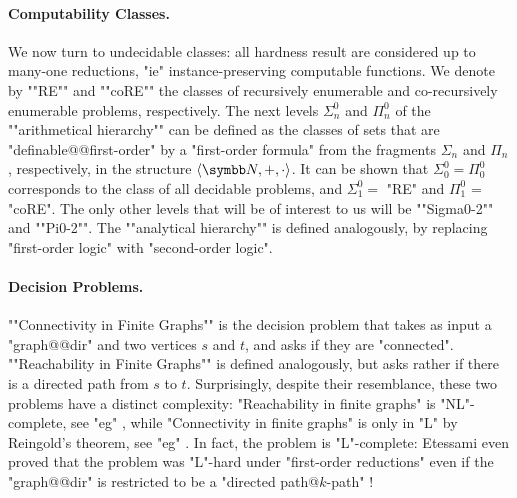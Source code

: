 \paragraph*{Computability Classes.}
We now turn to undecidable classes: all hardness result are considered up to
many-one reductions, "ie" instance-preserving computable functions.
We denote by \AP""RE"" and ""coRE"" the classes of recursively enumerable
and co-recursively enumerable problems, respectively. 
The next levels $\Sigma^0_n$ and $\Pi^0_n$ of the \AP""arithmetical hierarchy"" can be defined 
as the classes of sets that are "definable@@first-order" by a "first-order formula"
from the fragments $\Sigma_n$ and $\Pi_n$, respectively, in the structure $\tup{\N,+,\cdot}$.
It can be shown that $\Sigma^0_0 = \Pi^0_0$ corresponds to the class of all decidable problems,
and $\Sigma^0_1 =$ "RE" and $\Pi^0_1$ = "coRE". The only other levels that will be of interest
to us will be \AP""Sigma0-2"" and ""Pi0-2"".
The ""analytical hierarchy"" is defined analogously, by replacing "first-order logic" with
"second-order logic".


\paragraph*{Decision Problems.}
\AP""Connectivity in Finite Graphs"" is the decision problem
that takes as input a "graph@@dir" and two vertices $s$ and $t$,
and asks if they are "connected".
\AP ""Reachability in Finite Graphs"" is defined analogously,
but asks rather if there is a directed path from $s$ to $t$.
Surprisingly, despite their resemblance, these two problems have a distinct complexity:
"Reachability in finite graphs" is "NL"-complete, see "eg"
\cite[Theorem~4.18]{AroraBarak2009ComputationalComplexity}, while "Connectivity in finite graphs"
is only in "L" by Reingold's theorem, see "eg"
\cite[Theorem~21.21]{AroraBarak2009ComputationalComplexity}.
In fact, the problem is "L"-complete:
Etessami even proved that the problem
was "L"-hard under "first-order reductions" even if the "graph@@dir" is restricted to
be a "directed path@$k$-path" \cite[Theorem 3.2]{Etessami1997CountingLogSpace}!